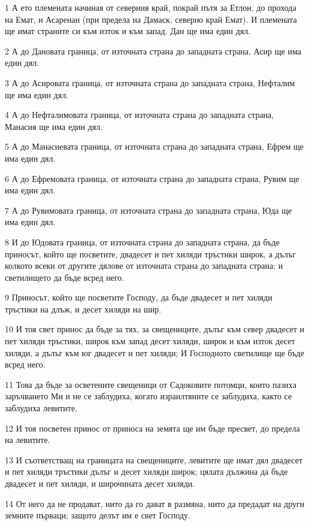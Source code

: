 \par 1 А ето племената начиная от северния край, покрай пътя за Етлон, до прохода на Емат, и Асаренан (при предела на Дамаск, северно край Емат). И племената ще имат страните си към изток и към запад. Дан ще има един дял.
\par 2 А до Дановата граница, от източната страна до западната страна, Асир ще има един дял.
\par 3 А до Асировата граница, от източната страна до западната страна, Нефталим ще има един дял.
\par 4 А до Нефталимовата граница, от източната страна до западната страна, Манасия ще има един дял.
\par 5 А до Манасиевата граница, от източната страна до западната страна, Ефрем ще има един дял.
\par 6 А до Ефремовата граница, от източната страна до западната страна, Рувим ще има един дял.
\par 7 А до Рувимовата граница, от източната страна до западната страна, Юда ще има един дял.
\par 8 И до Юдовата граница, от източната страна до западната страна, да бъде приносът, който ще посветите, двадесет и пет хиляди тръстики широк, а дълъг колкото всеки от другите дялове от източната страна до западната страна; и светилището да бъде всред него.
\par 9 Приносът, който ще посветите Господу, да бъде двадесет и пет хиляди тръстики на длъж, и десет хиляди на шир.
\par 10 И тоя свет принос да бъде за тях, за свещениците, дълъг към север двадесет и пет хиляди тръстики, широк към запад десет хиляди, широк и към изток десет хиляди, а дълъг към юг двадесет и пет хиляди; И Господното светилище ще бъде всред него.
\par 11 Това да бъде за осветените свещеници от Садоковите потомци, които пазиха заръчването Ми и не се заблудиха, когато израилтяните се заблудиха, както се заблудиха левитите.
\par 12 И тоя посветен принос от приноса на земята ще им бъде пресвет, до предела на левитите.
\par 13 И съответстващ на границата на свещениците, левитите ще имат дял двадесет и пет хиляди тръстики дълъг и десет хиляди широк; цялата дължина да бъде двадесет и пет хиляди, и широчината десет хиляди.
\par 14 От него да не продават, нито да го дават в размяна, нито да предадат на други земните първаци; защото делът им е свет Господу.
